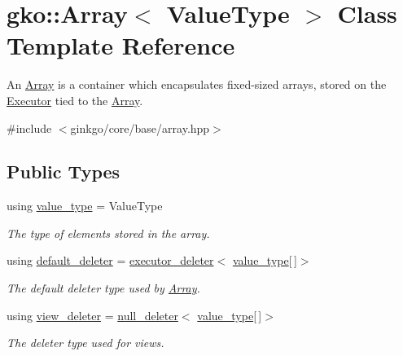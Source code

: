 \hypertarget{classgko_1_1Array}{}\section{gko\+:\+:Array$<$ Value\+Type $>$ Class Template Reference}
\label{classgko_1_1Array}


An \hyperlink{classgko_1_1Array}{Array} is a container which encapsulates fixed-\/sized arrays, stored on the \hyperlink{classgko_1_1Executor}{Executor} tied to the \hyperlink{classgko_1_1Array}{Array}.  




{\ttfamily \#include $<$ginkgo/core/base/array.\+hpp$>$}

\subsection*{Public Types}
\begin{DoxyCompactItemize}
\item 
\mbox{\label{classgko_1_1Array_ad40c95e429262175cae51bcabd291a5b}} 
using \hyperlink{classgko_1_1Array_ad40c95e429262175cae51bcabd291a5b}{value\+\_\+type} = Value\+Type
\begin{DoxyCompactList}\small\item\em The type of elements stored in the array. \end{DoxyCompactList}\item 
\mbox{\label{classgko_1_1Array_a39498b9cc303f4fa5685b2f98bb8ff4e}} 
using \hyperlink{classgko_1_1Array_a39498b9cc303f4fa5685b2f98bb8ff4e}{default\+\_\+deleter} = \hyperlink{classgko_1_1executor__deleter}{executor\+\_\+deleter}$<$ \hyperlink{classgko_1_1Array_ad40c95e429262175cae51bcabd291a5b}{value\+\_\+type}\mbox{[}$\,$\mbox{]}$>$
\begin{DoxyCompactList}\small\item\em The default deleter type used by \hyperlink{classgko_1_1Array}{Array}. \end{DoxyCompactList}\item 
\mbox{\label{classgko_1_1Array_af870dd6ab4ad4f7e0e20471cb17f4ad1}} 
using \hyperlink{classgko_1_1Array_af870dd6ab4ad4f7e0e20471cb17f4ad1}{view\+\_\+deleter} = \hyperlink{classgko_1_1null__deleter}{null\+\_\+deleter}$<$ \hyperlink{classgko_1_1Array_ad40c95e429262175cae51bcabd291a5b}{value\+\_\+type}\mbox{[}$\,$\mbox{]}$>$
\begin{DoxyCompactList}\small\item\em The deleter type used for views. \end{DoxyCompactList}\end{DoxyCompactItemize}
